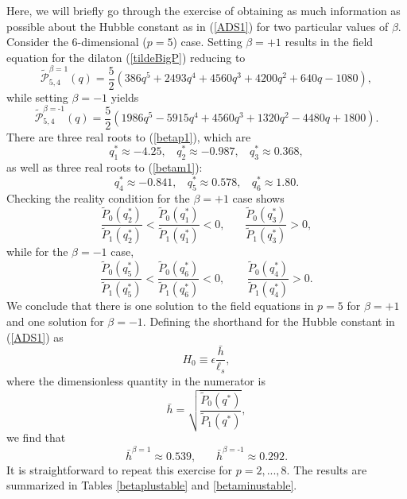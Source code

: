 \documentclass[amsmath,amssymb,11pt]{article}
\begin{document}
Here, we will briefly go through the exercise of obtaining as much information as possible about the Hubble constant as in (\ref{ADS1}) for two particular values of $\beta$. Consider the 6-dimensional ($p=5$) case. Setting $\beta=+1$ results in the field equation for the dilaton (\ref{tildeBigP}) reducing to 
\begin{equation}\label{betap1}
\tilde{\mathcal{P}}^{\beta=1}_{5,4}(q)=\frac{5}{2} \left(386 q^5+2493 q^4+4560 q^3+4200 q^2+640 q-1080\right),
\end{equation}
while setting $\beta=-1$ yields
\begin{equation}\label{betam1}
\tilde{\mathcal{P}}^{\beta=\text{-}1}_{5,4}(q)=\frac{5}{2} \left(1986 q^5-5915 q^4+4560 q^3+1320 q^2-4480 q+1800\right).
\end{equation}
There are three real roots to (\ref{betap1}), which are
\begin{equation}
q_1^*\approx-4.25, \ \ \ \ q_2^* \approx -0.987, \ \ \ \  q_3^*\approx 0.368,
\end{equation}
as well as three real roots to (\ref{betam1}):
\begin{equation}
q_4^*\approx -0.841, \ \ \ \ q_5^*\approx 0.578, \ \ \ \ q_6^*\approx 1.80.
\end{equation}
Checking the reality condition for the $\beta=+1$ case shows
\begin{equation}
\frac{\tilde{P}_0(q_2^*)}{\tilde{P}_1(q_2^*)}<\frac{\tilde{P}_0(q_1^*)}{\tilde{P}_1(q_1^*)} < 0, \ \ \ \ \ \ \ \  \frac{\tilde{P}_0(q_3^*)}{\tilde{P}_1(q_3^*)} >0,
\end{equation}
while for the $\beta=-1$ case,
\begin{equation}
\frac{\tilde{P}_0(q_5^*)}{\tilde{P}_1(q_5^*)}<\frac{\tilde{P}_0(q_6^*)}{\tilde{P}_1(q_6^*)}<0, \ \ \ \ \ \ \ \ \ \frac{\tilde{P}_0(q_4^*)}{\tilde{P}_1(q_4^*)}>0.
\end{equation}
We conclude that there is one solution to the field equations in $p=5$ for $\beta=+1$ and one solution for $\beta=-1.$ Defining the shorthand for the Hubble constant in (\ref{ADS1}) as
\begin{equation}
H_0\equiv \epsilon \frac{\bar{h}}{\ell_s},
\end{equation}
where the dimensionless quantity in the numerator is
\begin{equation}
\bar{h}=\sqrt{\frac{\tilde{P}_0(q^*)}{\tilde{P}_1(q^*)}},
\end{equation}
we find that
\begin{equation}
\bar{h}^{\beta=1}\approx 0.539, \ \ \ \ \ \ \ \ \bar{h}^{\beta=\text{-}1}\approx0.292.
\end{equation}
It is straightforward to repeat this exercise for $p=2,...,8$. The results are summarized in Tables \ref{betaplustable} and \ref{betaminustable}.
\end{document}
